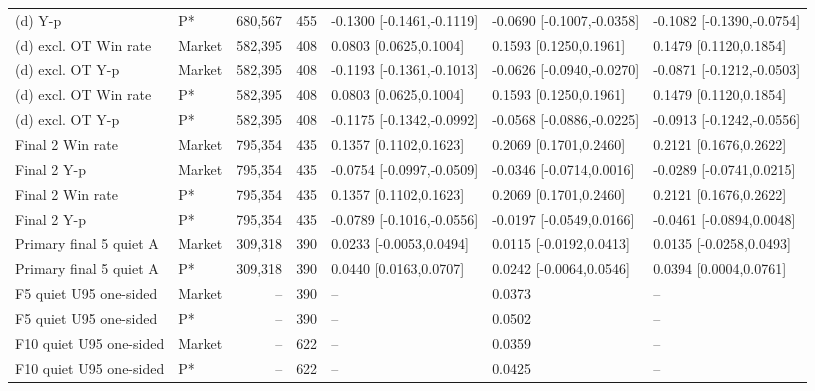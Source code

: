 \begin{table}[!htbp]
\begin{tabular}{llrrlll}
(d) Y-p & P* & 680,567 & 455 & -0.1300 [-0.1461,-0.1119] & -0.0690 [-0.1007,-0.0358] & -0.1082 [-0.1390,-0.0754] \\
(d) excl. OT Win rate & Market & 582,395 & 408 & 0.0803 [0.0625,0.1004] & 0.1593 [0.1250,0.1961] & 0.1479 [0.1120,0.1854] \\
(d) excl. OT Y-p & Market & 582,395 & 408 & -0.1193 [-0.1361,-0.1013] & -0.0626 [-0.0940,-0.0270] & -0.0871 [-0.1212,-0.0503] \\
(d) excl. OT Win rate & P* & 582,395 & 408 & 0.0803 [0.0625,0.1004] & 0.1593 [0.1250,0.1961] & 0.1479 [0.1120,0.1854] \\
(d) excl. OT Y-p & P* & 582,395 & 408 & -0.1175 [-0.1342,-0.0992] & -0.0568 [-0.0886,-0.0225] & -0.0913 [-0.1242,-0.0556] \\
Final 2 Win rate & Market & 795,354 & 435 & 0.1357 [0.1102,0.1623] & 0.2069 [0.1701,0.2460] & 0.2121 [0.1676,0.2622] \\
Final 2 Y-p & Market & 795,354 & 435 & -0.0754 [-0.0997,-0.0509] & -0.0346 [-0.0714,0.0016] & -0.0289 [-0.0741,0.0215] \\
Final 2 Win rate & P* & 795,354 & 435 & 0.1357 [0.1102,0.1623] & 0.2069 [0.1701,0.2460] & 0.2121 [0.1676,0.2622] \\
Final 2 Y-p & P* & 795,354 & 435 & -0.0789 [-0.1016,-0.0556] & -0.0197 [-0.0549,0.0166] & -0.0461 [-0.0894,0.0048] \\
Primary final 5 quiet A & Market & 309,318 & 390 & 0.0233 [-0.0053,0.0494] & 0.0115 [-0.0192,0.0413] & 0.0135 [-0.0258,0.0493] \\
Primary final 5 quiet A & P* & 309,318 & 390 & 0.0440 [0.0163,0.0707] & 0.0242 [-0.0064,0.0546] & 0.0394 [0.0004,0.0761] \\
F5 quiet U95 one-sided & Market & -- & 390 & -- & 0.0373 & -- \\
F5 quiet U95 one-sided & P* & -- & 390 & -- & 0.0502 & -- \\
F10 quiet U95 one-sided & Market & -- & 622 & -- & 0.0359 & -- \\
F10 quiet U95 one-sided & P* & -- & 622 & -- & 0.0425 & -- \\
\bottomrule
\end{tabular}
\end{table}
